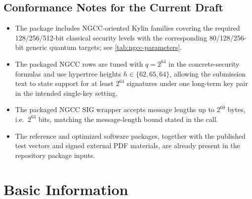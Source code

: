 \subsection{Conformance Notes for the Current Draft}

\begin{itemize}
    \item The package includes NGCC-oriented Kylin families covering the required 128/256/512-bit classical security levels with the corresponding 80/128/256-bit generic quantum targets; see \cref{tab:ngcc-parameters}.
    \item The packaged NGCC rows are tuned with $q=2^{64}$ in the concrete-security formulas and use hypertree heights $h\in\{62,65,64\}$, allowing the submission text to state support for at least $2^{64}$ signatures under one long-term key pair in the intended single-key setting.
    \item The packaged NGCC SIG wrapper accepts message lengths up to $2^{60}$ bytes, i.e.\ $2^{63}$ bits, matching the message-length bound stated in the call.
    \item The reference and optimized software packages, together with the published test vectors and signed external PDF materials, are already present in the repository package inputs.
\end{itemize}

\section{Basic Information}
\label{sec:basic-information}

